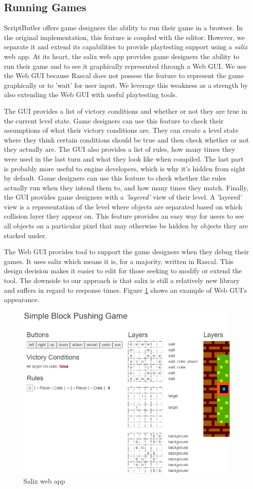 \subsection{Running Games}
ScriptButler offers game designers the ability to run their game in a browser. In the original implementation, this feature is coupled with the editor. However, we separate it and extend its capabilities to provide playtesting support using a \emph{salix} web app. At its heart, the salix web app provides game designers the ability to run their game and to see it graphically represented through a Web GUI. We use the Web GUI because Rascal does not possess the feature to represent the game graphically or to 'wait' for user input. We leverage this weakness as a strength by also extending the Web GUI with useful playtesting tools. 

The GUI provides a list of victory conditions and whether or not they are true in the current level state. Game designers can use this feature to check their assumptions of what their victory conditions are. They can create a level state where they think certain conditions should be true and then check whether or not they actually are. The GUI also provides a list of rules, how many times they were used in the last turn and what they look like when compiled. The last part is probably more useful to engine developers, which is why it's hidden from sight by default. Game designers can use this feature to check whether the rules actually run when they intend them to, and how many times they match. Finally, the GUI provides game designers with a \emph{'layered'} view of their level. A 'layered' view is a representation of the level where objects are separated based on which collision layer they appear on. This feature provides an easy way for users to see all objects on a particular pixel that may otherwise be hidden by objects they are stacked under.

The Web GUI provides tool to support the game designers when they debug their games. It uses salix which means it is, for a majority, written in Rascal. This design decision makes it easier to edit for those seeking to modify or extend the tool. The downside to our approach is that salix is still a relatively new library and suffers in regard to response times. Figure \ref{fig:salix_webserver} shows an example of Web GUI's appearance. 

\begin{figure}[!t]
    \centering
    \includegraphics[width=1\textwidth]{images/Rascal Salix.png}
    \caption{Salix web app}
    \label{fig:salix_webserver}
\end{figure}